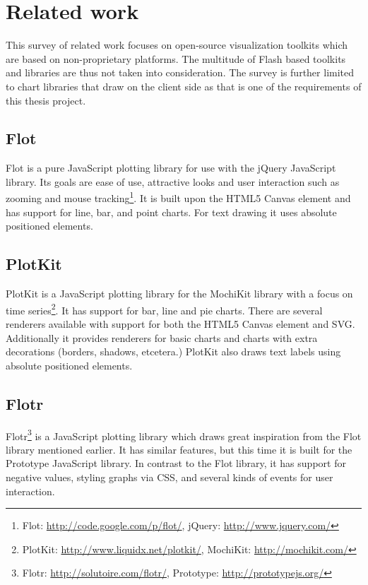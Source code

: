 \chapter{Related work}
This survey of related work focuses on open-source visualization toolkits which are based on non-proprietary platforms. The multitude of Flash based toolkits and libraries are thus not taken into consideration. The survey is further limited to chart libraries that draw on the client side as that is one of the requirements of this thesis project.

\section*{Flot}
Flot is a pure JavaScript plotting library for use with the jQuery JavaScript library. Its goals are ease of use, attractive looks and user interaction such as zooming and mouse tracking\footnote{Flot: \url{http://code.google.com/p/flot/}, jQuery: \url{http://www.jquery.com/}}. It is built upon the HTML5 Canvas element and has support for line, bar, and point charts. For text drawing it uses absolute positioned  elements. 

\section*{PlotKit}
PlotKit is a JavaScript plotting library for the MochiKit library with a focus on time series\footnote{PlotKit: \url{http://www.liquidx.net/plotkit/}, MochiKit: \url{http://mochikit.com/}}. It has support for bar, line and pie charts. There are several renderers available with support for both the HTML5 Canvas element and SVG. Additionally it provides renderers for basic charts and charts with extra decorations (borders, shadows, etcetera.) PlotKit also draws text labels using absolute positioned  elements.

\section*{Flotr}
Flotr\footnote{Flotr: \url{http://solutoire.com/flotr/}, Prototype: \url{http://prototypejs.org/}} is a JavaScript plotting library which draws great inspiration from the Flot library mentioned earlier. It has similar features, but this time it is built for the Prototype JavaScript library. In contrast to the Flot library, it has support for negative values, styling graphs via CSS, and several kinds of events for user interaction.

